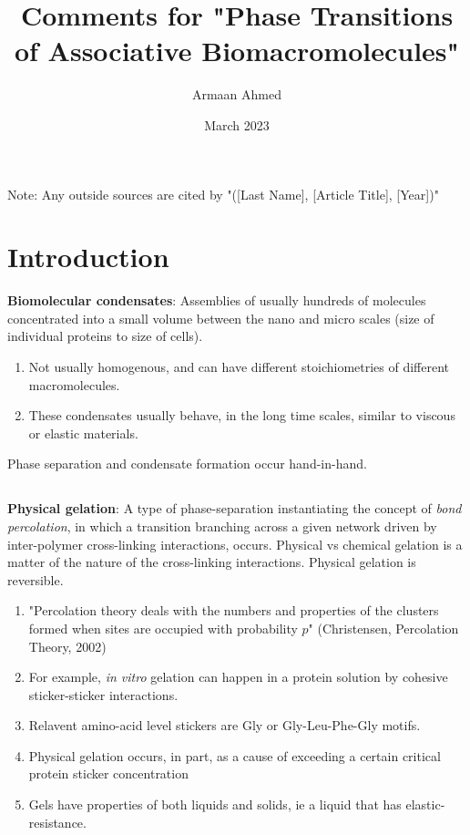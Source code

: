 \documentclass{article}
\title{Comments for "Phase Transitions of Associative Biomacromolecules"}
\author{Armaan Ahmed}
\date{March 2023}
\begin{document}
\maketitle

Note: Any outside sources are cited by "([Last Name], [Article Title], [Year])"

\section{Introduction}

\textbf{Biomolecular condensates}: Assemblies of usually hundreds of molecules concentrated into a small volume between the nano and micro scales (size of individual proteins to size of cells).

\begin{enumerate}
    \item Not usually homogenous, and can have different stoichiometries of different macromolecules.
    \item These condensates usually behave, in the long time scales, similar to viscous or elastic materials.
\end{enumerate}

Phase separation and condensate formation occur hand-in-hand.

\subsection{}

\textbf{Physical gelation}: A type of phase-separation instantiating the concept of \textit{bond percolation}, in which a transition branching across a given network driven by inter-polymer cross-linking interactions, occurs. Physical vs chemical gelation is a matter of the nature of the cross-linking interactions. Physical gelation is reversible.

\begin{enumerate}
    \item "Percolation theory deals with the numbers and properties of the clusters formed when sites are occupied with probability $p$" (Christensen, Percolation Theory, 2002)
    \item For example, \textit{in vitro} gelation can happen in a protein solution by cohesive sticker-sticker interactions.
    \item Relavent amino-acid level stickers are Gly or Gly-Leu-Phe-Gly motifs.
    \item Physical gelation occurs, in part, as a cause of exceeding a certain critical protein sticker concentration
    \item Gels have properties of both liquids and solids, ie a liquid that has elastic-resistance.
\end{enumerate}
\end{document}
